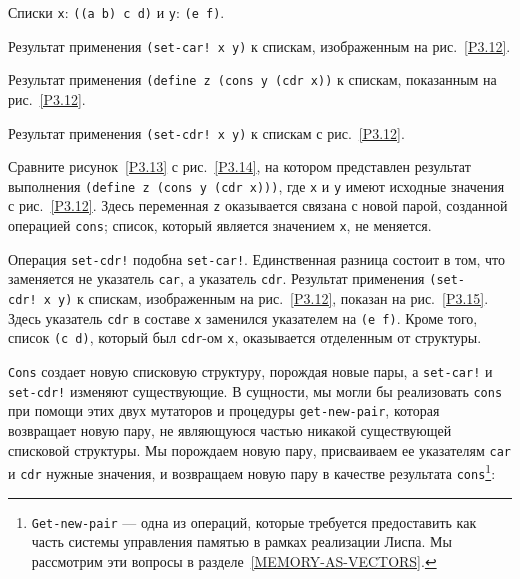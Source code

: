 
\begin{cntrfig}

\caption{Списки {\tt x}: {\tt ((a b) c
d)} и {\tt y}: {\tt (e f)}.}
\label{P3.12}

\end{cntrfig}


\begin{cntrfig}

\caption{Результат применения {\tt (set-car! x y)} к спискам, изображенным на рис.~\ref{P3.12}.}
\label{P3.13}

\end{cntrfig}


\begin{cntrfig}

\caption{Результат применения {\tt (define z (cons
y (cdr x))} к спискам, показанным на рис.~\ref{P3.12}.}
\label{P3.14}

\end{cntrfig}


\begin{cntrfig}

\caption{Результат применения {\tt (set-cdr! x
y)} к спискам с рис.~\ref{P3.12}.}
\label{P3.15}

\end{cntrfig}

Сравните рисунок~\ref{P3.13} с
рис.~\ref{P3.14}, на котором представлен результат
выполнения {\tt (define z (cons y (cdr x)))}, где
{\tt x} и {\tt y} имеют исходные значения с
рис.~\ref{P3.12}.  Здесь переменная {\tt z}
оказывается связана с новой парой, созданной операцией
{\tt cons}; список, который является значением {\tt x},
не меняется.

Операция {\tt set-cdr!} подобна {\tt set-car!}.
Единственная разница состоит в том, что заменяется не указатель
{\tt car}, а указатель {\tt cdr}.  Результат применения
{\tt (set-cdr!~x~y)} к спискам, изображенным на
рис.~\ref{P3.12}, показан на рис.~\ref{P3.15}.
Здесь указатель {\tt cdr} в составе {\tt x} заменился
указателем на {\tt (e f)}.  Кроме того, список {\tt (c
d)}, который был {\tt cdr}-ом {\tt x}, оказывается
отделенным от структуры.

{\tt Cons} создает новую списковую структуру,
порождая новые пары, а  {\tt set-car!} и {\tt set-cdr!}
изменяют существующие.  В сущности, мы могли бы реализовать
{\tt cons} при помощи этих двух мутаторов и процедуры
{\tt get-new-pair}, которая возвращает новую пару, не
являющуюся частью никакой существующей списковой структуры.  Мы
порождаем новую пару, присваиваем ее указателям {\tt car} и
{\tt cdr} нужные значения, и возвращаем новую пару в качестве
результата {\tt cons}\footnote{{\tt Get-new-pair} --- одна из операций, которые
требуется предоставить как часть системы управления памятью в рамках
реализации Лиспа.  Мы рассмотрим эти вопросы в
разделе~\ref{MEMORY-AS-VECTORS}.
}:

